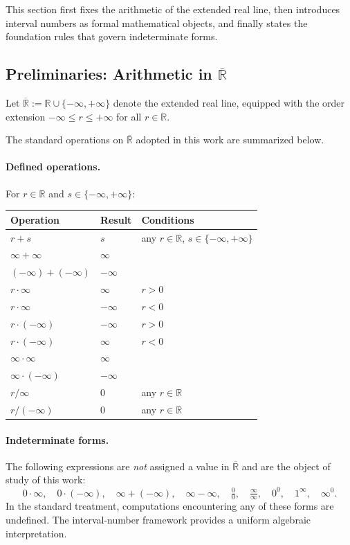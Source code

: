 \documentclass[11pt,a4paper]{article}
\theoremstyle{paperdef}
\newcommand{\Rext}{\overline{\mathbb{R}}}
\begin{document}
This section first fixes the arithmetic of the extended real line,
then introduces interval numbers as formal mathematical objects, and
finally states the foundation rules that govern indeterminate forms.

\subsection{Preliminaries: Arithmetic in \texorpdfstring{$\Rext$}{R-bar}}

Let $\Rext := \mathbb{R} \cup \{-\infty, +\infty\}$ denote the extended
real line, equipped with the order extension
$-\infty \le r \le +\infty$ for all $r \in \mathbb{R}$.

The standard operations on $\Rext$ adopted in this work are summarized
below.

\paragraph{Defined operations.}
For $r \in \mathbb{R}$ and $s \in \{-\infty, +\infty\}$:

\begin{center}
\begin{tabular}{@{}lll@{}}
\toprule
Operation & Result & Conditions \\
\midrule
$r + s$ & $s$ & any $r \in \mathbb{R}$, $s \in \{-\infty, +\infty\}$ \\
$\infty + \infty$ & $\infty$ & \\
$(-\infty) + (-\infty)$ & $-\infty$ & \\
$r \cdot \infty$ & $\infty$ & $r > 0$ \\
$r \cdot \infty$ & $-\infty$ & $r < 0$ \\
$r \cdot (-\infty)$ & $-\infty$ & $r > 0$ \\
$r \cdot (-\infty)$ & $\infty$ & $r < 0$ \\
$\infty \cdot \infty$ & $\infty$ & \\
$\infty \cdot (-\infty)$ & $-\infty$ & \\
$r / \infty$ & $0$ & any $r \in \mathbb{R}$ \\
$r / (-\infty)$ & $0$ & any $r \in \mathbb{R}$ \\
\bottomrule
\end{tabular}
\end{center}

\paragraph{Indeterminate forms.}
The following expressions are \emph{not} assigned a value in $\Rext$
and are the object of study of this work:
\[
0 \cdot \infty,\quad 0 \cdot (-\infty),\quad \infty + (-\infty),\quad
\infty - \infty,\quad \tfrac{0}{0},\quad \tfrac{\infty}{\infty},\quad
0^{0},\quad 1^{\infty},\quad \infty^{0}.
\]
In the standard treatment, computations encountering any of these
forms are undefined. The interval-number framework provides a uniform
algebraic interpretation.
\end{document}
